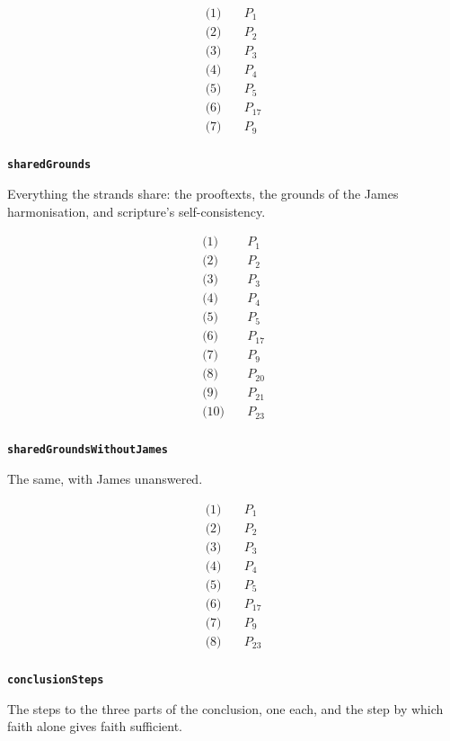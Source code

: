 \documentclass[11pt]{article}
\begin{document}
\begin{align*}
  \text{(1)} \quad & P_{1} \\
  \text{(2)} \quad & P_{2} \\
  \text{(3)} \quad & P_{3} \\
  \text{(4)} \quad & P_{4} \\
  \text{(5)} \quad & P_{5} \\
  \text{(6)} \quad & P_{17} \\
  \text{(7)} \quad & P_{9} \\
\end{align*}
\par\medskip\noindent\textbf{\texttt{shared\allowbreak{}Grounds}}\par\nobreak\noindent
Everything the strands share: the prooftexts, the grounds of the James harmonisation, and scripture's self-consistency.

\begin{align*}
  \text{(1)} \quad & P_{1} \\
  \text{(2)} \quad & P_{2} \\
  \text{(3)} \quad & P_{3} \\
  \text{(4)} \quad & P_{4} \\
  \text{(5)} \quad & P_{5} \\
  \text{(6)} \quad & P_{17} \\
  \text{(7)} \quad & P_{9} \\
  \text{(8)} \quad & P_{20} \\
  \text{(9)} \quad & P_{21} \\
  \text{(10)} \quad & P_{23} \\
\end{align*}
\par\medskip\noindent\textbf{\texttt{shared\allowbreak{}Grounds\allowbreak{}Without\allowbreak{}James}}\par\nobreak\noindent
The same, with James unanswered.

\begin{align*}
  \text{(1)} \quad & P_{1} \\
  \text{(2)} \quad & P_{2} \\
  \text{(3)} \quad & P_{3} \\
  \text{(4)} \quad & P_{4} \\
  \text{(5)} \quad & P_{5} \\
  \text{(6)} \quad & P_{17} \\
  \text{(7)} \quad & P_{9} \\
  \text{(8)} \quad & P_{23} \\
\end{align*}
\par\medskip\noindent\textbf{\texttt{conclusion\allowbreak{}Steps}}\par\nobreak\noindent
The steps to the three parts of the conclusion, one each, and the step by which faith alone gives faith sufficient.
\end{document}
